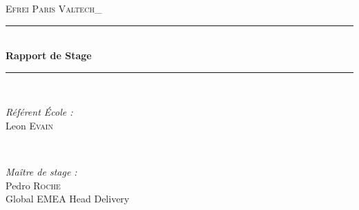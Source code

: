 ﻿\begin{titlepage}
    \newcommand{\HRule}{\rule{\linewidth}{0.7mm}} %
    
    \center %
    
    
    \textsc{\LARGE Efrei Paris \- Valtech\_}\\[1.5cm] %
    
    
    \HRule \\[0.4cm]
    { \huge \bfseries Rapport de Stage }\\[0.4cm] %
    \HRule \\[1.5cm]
    
    
    \begin{minipage}{0.4\textwidth}
    \begin{flushleft} \large
    \emph{Référent \'Ecole :}\\
    Leon \textsc{Evain} %
    \end{flushleft}
    \end{minipage}
    ~
    \begin{minipage}{0.4\textwidth}
    \begin{flushright} \large
    \emph{Maître de stage :}\\
    Pedro \textsc{Roche}\\ %
    Global EMEA Head Delivery
    \end{flushright}
    \end{minipage}\\[4cm]
    

\end{titlepage}
